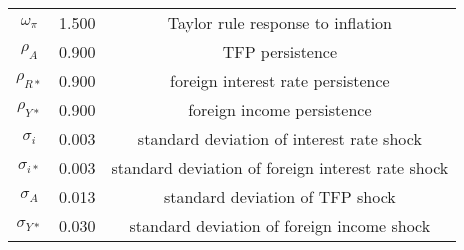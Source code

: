 \begin{center}
\begin{longtable}{ccc}
$\omega_{\pi}$ 	 & 	 1.500 	 & 	 Taylor rule response to inflation\\
$\rho_{A}$ 	 & 	 0.900 	 & 	 TFP persistence\\
$\rho_{R*}$ 	 & 	 0.900 	 & 	 foreign interest rate persistence\\
$\rho_{Y*}$ 	 & 	 0.900 	 & 	 foreign income persistence\\
$\sigma_{i}$ 	 & 	 0.003 	 & 	 standard deviation of interest rate shock\\
$\sigma_{i*}$ 	 & 	 0.003 	 & 	 standard deviation of foreign interest rate shock\\
$\sigma_{A}$ 	 & 	 0.013 	 & 	 standard deviation of TFP shock\\
$\sigma_{Y*}$ 	 & 	 0.030 	 & 	 standard deviation of foreign income shock\\
\bottomrule%
\end{longtable}
\end{center}
